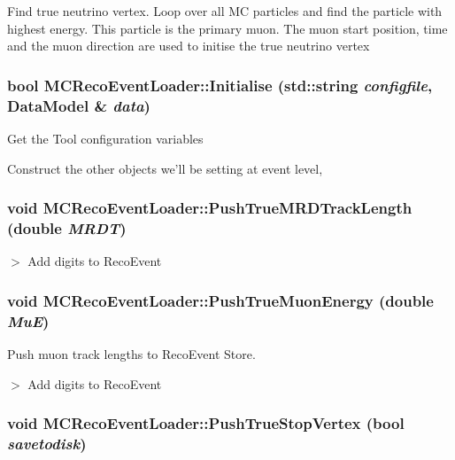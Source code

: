 Find true neutrino vertex. Loop over all MC particles and find the particle with highest energy. This particle is the primary muon. The muon start position, time and the muon direction are used to initise the true neutrino vertex \hypertarget{classMCRecoEventLoader_a3c57d089982246d613d553092ab8f141}{
\subsubsection[{Initialise}]{\setlength{\rightskip}{0pt plus 5cm}bool MCRecoEventLoader::Initialise (std::string {\em configfile}, \/  {\bf DataModel} \& {\em data})}}
\label{classMCRecoEventLoader_a3c57d089982246d613d553092ab8f141}


Get the Tool configuration variables

Construct the other objects we'll be setting at event level, \hypertarget{classMCRecoEventLoader_a258d351d5afce9a2be153db10a80ae3a}{
\subsubsection[{PushTrueMRDTrackLength}]{\setlength{\rightskip}{0pt plus 5cm}void MCRecoEventLoader::PushTrueMRDTrackLength (double {\em MRDT})}}
\label{classMCRecoEventLoader_a258d351d5afce9a2be153db10a80ae3a}


$>$ Add digits to RecoEvent \hypertarget{classMCRecoEventLoader_a253c2747d42e4112c039ecafc93ee05e}{
\subsubsection[{PushTrueMuonEnergy}]{\setlength{\rightskip}{0pt plus 5cm}void MCRecoEventLoader::PushTrueMuonEnergy (double {\em MuE})}}
\label{classMCRecoEventLoader_a253c2747d42e4112c039ecafc93ee05e}


Push muon track lengths to RecoEvent Store. 

$>$ Add digits to RecoEvent \hypertarget{classMCRecoEventLoader_a57ec5fa238eed8885465bf6d3e03078c}{
\subsubsection[{PushTrueStopVertex}]{\setlength{\rightskip}{0pt plus 5cm}void MCRecoEventLoader::PushTrueStopVertex (bool {\em savetodisk})}}
\label{classMCRecoEventLoader_a57ec5fa238eed8885465bf6d3e03078c}


